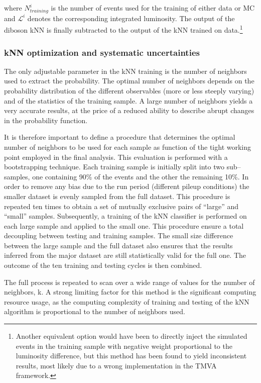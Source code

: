 where $N_{training}^{i}$ is the number of events used for the training of either data or MC and $\mathcal{L}^{i}$ denotes the corresponding integrated luminosity. The output of the diboson kNN is finally subtracted to the output of the kNN trained on data.\footnote{Another equivalent option would have been to directly inject the simulated events in the training sample with negative weight proportional to the luminosity difference, but this method has been found to yield inconsistent results, most likely due to a wrong implementation in the TMVA framework.}

\subsubsection{kNN optimization and systematic uncertainties}
\label{sec:kNN_uncertainties}

The only adjustable parameter in the kNN training is the number of neighbors used to extract the probability. 
The optimal number of neighbors depends on the probability distribution of the different observables (more or less steeply varying) and of the statistics of the training sample. 
A large number of neighbors yields a very accurate results, at the price of a reduced ability to describe abrupt changes in the probability function.

It is therefore important to define a procedure that determines the optimal number of neighbors to be used for each sample as function of the tight working point employed in the final analysis. This evaluation is performed with a bootstrapping technique.
Each training sample is initially split into two sub--samples, one containing 90\% of the events and the other the remaining 10\%. In order to remove any bias due to the run period (different pileup conditions) the smaller dataset is evenly sampled from the full dataset. This procedure is repeated ten times to obtain a set of mutually exclusive pairs of ``large'' and ``small'' samples. Subsequently, a training of the kNN classifier is performed on each large sample and applied to the small one. This procedure ensure a total decoupling between testing and training samples. The small size difference between the large sample and the full dataset also ensures that the results inferred from the major dataset are still statistically valid for the full one. The outcome of the ten training and testing cycles is then combined. 

The full process is repeated to scan over a wide range of values for the number of neighbors, k. A strong limiting factor for this method is the significant computing resource usage, as the computing complexity of training and testing of the kNN algorithm is proportional to the number of neighbors used.%


